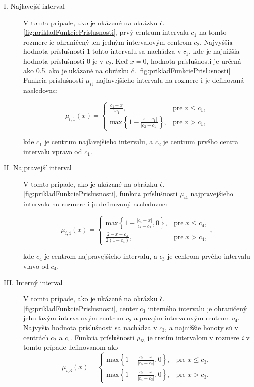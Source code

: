 \begin{description}
\item[I. Najľavejší interval] 

V tomto prípade, ako je ukázané na obrázku č. \ref{fig:prikladFunkciePrislusnosti}, prvý centrum intervalu $c_1$ na tomto rozmere ie ohraničený len jedným intervalovým centrom $c_2$. Najvyššia hodnota príslušnosti 1 tohto intervalu sa nachádza v $c_1$, kde je najnižšia hodnota príslušnosti 0 je v $c_2$. Keď $x=0$, hodnota príslušnosti je určená ako 0.5, ako je ukázané na obrázku č. \ref{fig:prikladFunkciePrislusnosti}. Funkcia príslušnosti $\mu_{i1}$ najľavejšieho intervalu na rozmere i je definovaná nasledovne:  

$$
\mu_{i, 1}(x) = 
\begin{cases}
{\frac{c_1 + x}{2c_1}, } &  \textrm{pre } x \leq   c_1 ,
\\
\textrm{max} \left\{1 -\frac{| x-c_1|}{ | c_2 - c_1 |} \right\},
&  \textrm{pre } x >  c_1, \end{cases}
$$

kde $c_1$ je centrum najľavejšieho intervalu, a $c_2$ je centrum prvého centra intervalu vpravo od $c_1$. 

\item[II. Najpravejší interval ]
V tomto prípade, ako je ukázané na obrázku  č. \ref{fig:prikladFunkciePrislusnosti}, funkcia príslušnosti $\mu_{i4}$ najpravejšieho intervalu na rozmere i je definovaný nasledovne:

\begin{displaymath}
\mu_{i, 4}(x) = 
\begin{cases} 
\textrm{max} \left\{
1 -\frac{| c_4-x|}{c_4-c_3} , 0
\right\}, 
& \textrm{pre } x \leq   c_4 ,
\\ 
\frac{2- x - c_4 }{2(1-c_4)}, 
& \textrm{pre } x >   c_4 ,
  \end{cases}, 
\end{displaymath}

kde $c_4$ je centrom najpravejšieho intervalu, a $c_3$ je centrom prvého intervalu vľavo od $c_4$. 


\item[III. Interný interval]
V tomto prípade, ako je ukázané na obrázku  č. \ref{fig:prikladFunkciePrislusnosti}, center $c_3$ interného intervalu je ohraničený jeho ľavým intervalovým centrom $c_2$ a pravým intervalovým centrom $c_4$. Najvyšia hodnota príslušnosti sa nachádza v $c_3$, a najnižšie honoty sú v centrách $c_2$ a $c_4$. Funkcia príslušnosti $\mu_{i3}$ je tretím intervalom v rozmere \textit{i} v tomto prípade definovanom ako  
$$
\mu_{i, 3}(x) = 
\begin{cases}
\textrm{max} \left\{
1 -\frac{| c_3-x|}{|c_3-c_2|} , 0
\right\}, 
& \textrm{pre } x \leq   c_3,
\\
\textrm{max} \left\{
1 -\frac{| c_3-x|}{|c_4-c_3|} , 0
\right\}, 
& \textrm{pre } x >  c_3.
\end{cases} 
$$

\end{description}

